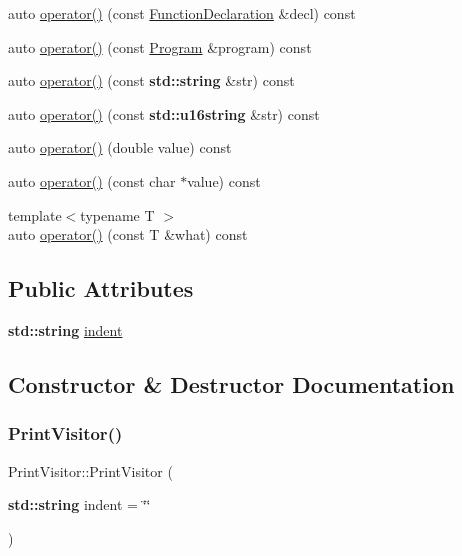\begin{DoxyCompactItemize}
\item 
auto \hyperlink{struct_print_visitor_a6a9be1713bd30421f55b7606f00dbcd8}{operator()} (const \hyperlink{struct_function_declaration}{Function\+Declaration} \&decl) const
\item 
auto \hyperlink{struct_print_visitor_a8acc0e45686e3f9a4b8ed8e37175b89d}{operator()} (const \hyperlink{struct_program}{Program} \&program) const
\item 
auto \hyperlink{struct_print_visitor_ab4955e4e1389498d237c44ae863f9ba4}{operator()} (const \textbf{ std\+::string} \&str) const
\item 
auto \hyperlink{struct_print_visitor_aef6fd26e6d8681bd72e209a943b2a31f}{operator()} (const \textbf{ std\+::u16string} \&str) const
\item 
auto \hyperlink{struct_print_visitor_a5e2fc45c187b641a12420f4c3cce0a25}{operator()} (double value) const
\item 
auto \hyperlink{struct_print_visitor_ae440fc88025c0dd39e9c8aa8b29394fa}{operator()} (const char $\ast$value) const
\item 
{\footnotesize template$<$typename T $>$ }\\auto \hyperlink{struct_print_visitor_ae6fa94fb3d82551ef22ab2012a0bf0b9}{operator()} (const T \&what) const
\end{DoxyCompactItemize}
\subsection*{Public Attributes}
\begin{DoxyCompactItemize}
\item 
\textbf{ std\+::string} \hyperlink{struct_print_visitor_a6cda79fa0db4cc99a40958601fbbcc37}{indent}
\end{DoxyCompactItemize}


\subsection{Constructor \& Destructor Documentation}
\mbox{\label{struct_print_visitor_a113b1e0ee300672fc7f8ca96911a1f2f}} 
\subsubsection{\texorpdfstring{Print\+Visitor()}{PrintVisitor()}}
{\footnotesize\ttfamily Print\+Visitor\+::\+Print\+Visitor (\begin{DoxyParamCaption}\item[{\textbf{ std\+::string}}]{indent = {\ttfamily \char`\"{}\char`\"{}} }\end{DoxyParamCaption})\hspace{0.3cm}{\ttfamily [inline]}}



